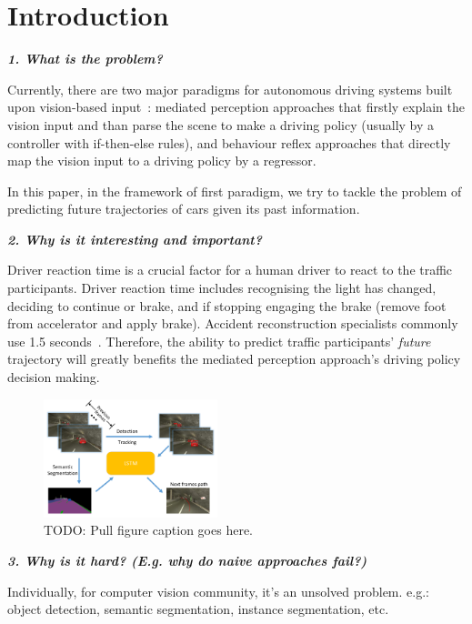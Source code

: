 \documentclass[10pt,twocolumn,letterpaper]{article}
\begin{document}
\section{Introduction}



\textbf{\emph{1. What is the problem?}}

Currently, there are two major paradigms for autonomous driving systems built upon vision-based input~\cite{chen2015deepdriving}: mediated perception approaches that firstly explain the vision input and than parse the scene to make a driving policy (usually by a controller with if-then-else rules), and behaviour reflex approaches that directly map the vision input to a driving policy by a regressor.

In this paper, in the framework of first paradigm, we try to tackle the problem of predicting future trajectories of cars given its past information.

\textbf{\emph{2. Why is it interesting and important?}}

Driver reaction time is a crucial factor for a human driver to react to the traffic participants. Driver reaction time includes recognising the light has changed, deciding to continue or brake, and if stopping engaging the brake (remove foot from accelerator and apply brake). Accident reconstruction specialists commonly use 1.5 seconds~\cite{mcgehee2000driver}.
Therefore, the ability to predict traffic participants' \emph{future} trajectory will greatly benefits the mediated perception approach's driving policy decision making.

\begin{figure}[t]
        \centering
        \includegraphics[width=0.45\textwidth]{figures/pull_figure.pdf}
        \caption{ {\small TODO: Pull figure caption goes here.}}
        \label{fig:pull_figure}
\end{figure}
\textbf{\emph{3. Why is it hard? (E.g. why do naive approaches fail?)}}

Individually, for computer vision community, it's an unsolved problem. e.g.: object detection, semantic segmentation, instance segmentation, etc.
\end{document}
